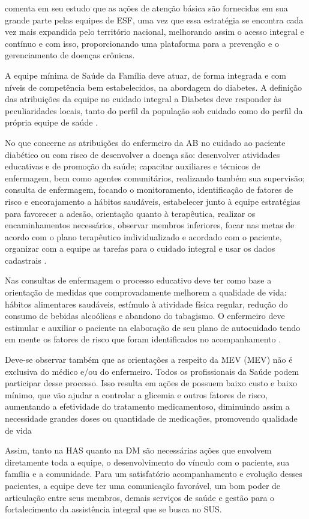 \cite{chor2011saude} comenta em seu estudo que as ações de atenção básica são fornecidas em sua grande parte pelas equipes de ESF, uma vez que essa estratégia se encontra cada vez mais expandida pelo território nacional, melhorando assim o acesso integral e contínuo e com isso, proporcionando uma plataforma para a prevenção e o gerenciamento de doenças crônicas.

A equipe mínima de Saúde da Família deve atuar, de forma integrada e com níveis de competência bem estabelecidos, na abordagem do diabetes. A definição das atribuições da equipe no cuidado integral a Diabetes deve responder às peculiaridades locais, tanto do perfil da população sob cuidado como do perfil da própria equipe de saúde \cite{atencaobasica16}.

No que concerne as atribuições do enfermeiro da AB no cuidado ao paciente diabético ou com risco de desenvolver a doença são: desenvolver atividades educativas e de promoção da saúde; capacitar auxiliares e técnicos de enfermagem, bem como agentes comunitários, realizando também sua supervisão; consulta de enfermagem, focando o monitoramento, identificação de fatores de risco e encorajamento a hábitos saudáveis, estabelecer junto à equipe estratégias para favorecer a adesão, orientação quanto à terapêutica, realizar os encaminhamentos necessários, observar membros inferiores, focar nas metas de acordo com o plano terapêutico individualizado e acordado com o paciente, organizar com a equipe as tarefas para o cuidado integral e usar os dados cadastrais \cite{atencaobasica16}.

Nas consultas de enfermagem o processo educativo deve ter como base a orientação de medidas que comprovadamente melhorem a qualidade de vida: hábitos alimentares saudáveis, estímulo à atividade física regular, redução do consumo de bebidas alcoólicas e abandono do tabagismo. O enfermeiro deve estimular e auxiliar o paciente na elaboração de seu plano de autocuidado tendo em mente os fatores de risco que foram identificados no acompanhamento \cite{atencaobasica16}.

Deve-se observar também que as orientações a respeito da \acrlong{MEV} (\acrshort{MEV}) não é exclusiva do médico e/ou do enfermeiro. Todos os profissionais da Saúde podem participar desse processo. Isso resulta em ações de possuem baixo custo e baixo mínimo, que vão ajudar a controlar a glicemia e outros fatores de risco, aumentando a efetividade do tratamento medicamentoso, diminuindo assim a necessidade grandes doses ou quantidade de medicações, promovendo qualidade de vida \cite{atencaobasica37}

Assim, tanto na HAS quanto na DM são necessárias ações que envolvem diretamente toda a equipe, o desenvolvimento do vínculo com o paciente, sua família e a comunidade. Para um satisfatório acompanhamento e evolução desses pacientes, a equipe deve ter uma comunicação favorável, um bom poder de articulação entre seus membros, demais serviços de saúde e gestão para o fortalecimento da assistência integral que se busca no SUS.